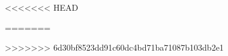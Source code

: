 \raggedbottom													%


\frontmatter													%


\tableofcontents*												%

\mainmatter														%

<<<<<<< HEAD







=======

%

%
%
%

>>>>>>> 6d30bf8523dd91c60dc4bd71ba71087b103db2e1

\begingroup
\raggedright
							
\endgroup

\newpage														%

\appendix														%
\clearforchapter												%

